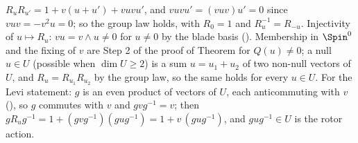 $R_u R_{u'} = 1 + v(u + u') + vuvu'$, and $vuvu' = (vuv)u' = 0$ since $vuv = -v^2u = 0$; so the group law holds, with $R_0 = 1$ and $R_u^{-1} = R_{-u}$. Injectivity of $u \mapsto R_u$: $vu = v \wedge u \neq 0$ for $u \neq 0$ by the blade basis (). Membership in $\Spin^0$ and the fixing of $v$ are Step 2 of the proof of Theorem  for $Q(u) \neq 0$; a null $u \in U$ (possible when $\dim U \geq 2$) is a sum $u = u_1 + u_2$ of two non-null vectors of $U$, and $R_u = R_{u_1}R_{u_2}$ by the group law, so the same holds for every $u \in U$. For the Levi statement: $g$ is an even product of vectors of $U$, each anticommuting with $v$ (), so $g$ commutes with $v$ and $gvg^{-1} = v$; then $g R_u g^{-1} = 1 + (gvg^{-1})(gug^{-1}) = 1 + v\,(gug^{-1})$, and $gug^{-1} \in U$ is the rotor action.
